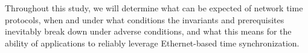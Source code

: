 Throughout this study, we will determine what can be expected of network time protocols, when and under what conditions the invariants and prerequisites inevitably break down under adverse conditions, and what this means for the ability of applications to reliably leverage Ethernet-based time synchronization.


